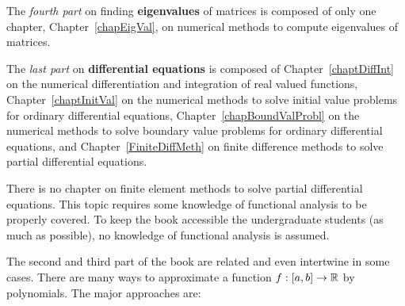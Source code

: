 The {\em fourth part} on finding {\bfseries eigenvalues} of matrices
is composed of only one chapter, Chapter~\ref{chapEigVal}, on
numerical methods to compute eigenvalues of \nn matrices.

The {\em last part} on {\bfseries differential equations} is
composed of Chapter~\ref{chaptDiffInt} on the numerical
differentiation and integration of real valued functions,
Chapter~\ref{chaptInitVal} on the numerical methods to solve initial
value problems for ordinary differential equations,
Chapter~\ref{chapBoundValProbl} on the numerical methods to solve
boundary value problems for ordinary differential equations, and
Chapter~\ref{FiniteDiffMeth} on finite difference methods to solve
partial differential equations.

There is no chapter on finite element methods to solve partial
differential equations.  This topic requires some knowledge of
functional analysis to be properly covered.  To keep the book
accessible the undergraduate students (as much as possible), no
knowledge of functional analysis is assumed. 

The second and third part of the book are related and even
intertwine in some cases.  There are many ways to approximate a
function $f:[a,b] \rightarrow \mathbb{R}$ by polynomials.  The major
approaches are:

